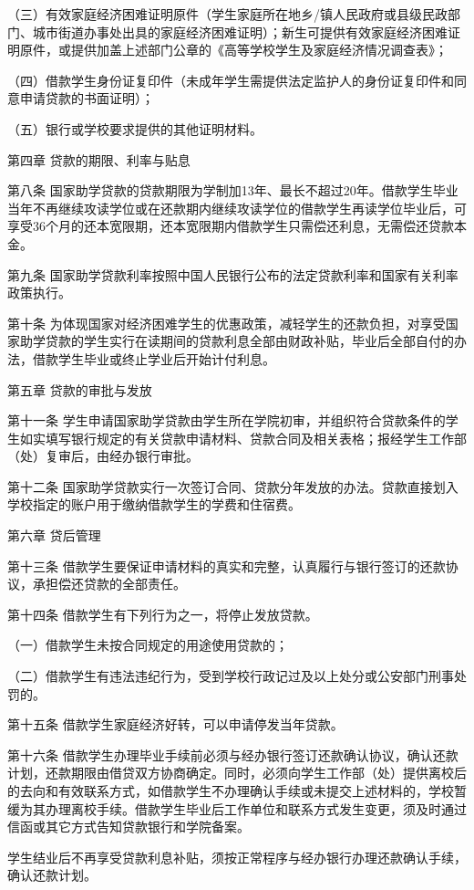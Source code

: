\documentclass[UTF8,12pt,a4paper]{report}
\begin{document}
（三）有效家庭经济困难证明原件（学生家庭所在地乡/镇人民政府或县级民政部门、城市街道办事处出具的家庭经济困难证明）；新生可提供有效家庭经济困难证明原件，或提供加盖上述部门公章的《高等学校学生及家庭经济情况调查表》；

（四）借款学生身份证复印件（未成年学生需提供法定监护人的身份证复印件和同意申请贷款的书面证明）；

（五）银行或学校要求提供的其他证明材料。

第四章 贷款的期限、利率与贴息

第八条 国家助学贷款的贷款期限为学制加13年、最长不超过20年。借款学生毕业当年不再继续攻读学位或在还款期内继续攻读学位的借款学生再读学位毕业后，可享受36个月的还本宽限期，还本宽限期内借款学生只需偿还利息，无需偿还贷款本金。

第九条 国家助学贷款利率按照中国人民银行公布的法定贷款利率和国家有关利率政策执行。

第十条 为体现国家对经济困难学生的优惠政策，减轻学生的还款负担，对享受国家助学贷款的学生实行在读期间的贷款利息全部由财政补贴，毕业后全部自付的办法，借款学生毕业或终止学业后开始计付利息。

第五章 贷款的审批与发放

第十一条 学生申请国家助学贷款由学生所在学院初审，并组织符合贷款条件的学生如实填写银行规定的有关贷款申请材料、贷款合同及相关表格；报经学生工作部（处）复审后，由经办银行审批。

第十二条 国家助学贷款实行一次签订合同、贷款分年发放的办法。贷款直接划入学校指定的账户用于缴纳借款学生的学费和住宿费。

第六章 贷后管理

第十三条 借款学生要保证申请材料的真实和完整，认真履行与银行签订的还款协议，承担偿还贷款的全部责任。

第十四条 借款学生有下列行为之一，将停止发放贷款。

（一）借款学生未按合同规定的用途使用贷款的；

（二）借款学生有违法违纪行为，受到学校行政记过及以上处分或公安部门刑事处罚的。

第十五条 借款学生家庭经济好转，可以申请停发当年贷款。

第十六条 借款学生办理毕业手续前必须与经办银行签订还款确认协议，确认还款计划，还款期限由借贷双方协商确定。同时，必须向学生工作部（处）提供离校后的去向和有效联系方式，如借款学生不办理确认手续或未提交上述材料的，学校暂缓为其办理离校手续。借款学生毕业后工作单位和联系方式发生变更，须及时通过信函或其它方式告知贷款银行和学院备案。

学生结业后不再享受贷款利息补贴，须按正常程序与经办银行办理还款确认手续，确认还款计划。
\end{document}
